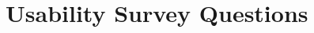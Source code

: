 \documentclass[12pt, titlepage]{article}
\begin{document}


				




\newpage

\section{Usability Survey Questions} \label{Survey}
\end{document}
